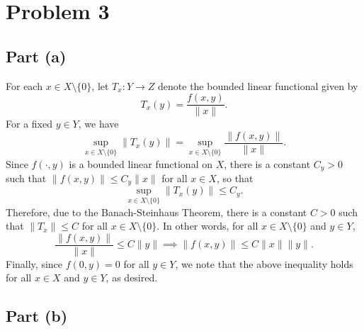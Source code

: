 \documentclass[11pt]{article}
\theoremstyle{thmstyle}
\theoremstyle{defstyle}
\renewcommand{\le}{\leqslant}
\newcommand{\sminus}{\setminus}
\begin{document}
\section{Problem 3}

\subsection{Part (a)}

For each $x\in X\setminus\{0\}$, let $T_x\colon Y\to Z$ denote the bounded linear functional given by 
\begin{equation*}
    T_x(y) = \frac{f(x, y)}{\|x\|}.
\end{equation*}
For a fixed $y\in Y$, we have 
\begin{equation*}
    \sup_{x\in X\setminus\{0\}}\|T_x(y)\| = \sup_{x\in X\setminus\{0\}}\frac{\|f(x, y)\|}{\|x\|}.
\end{equation*}
Since $f(\cdot, y)$ is a bounded linear functional on $X$, there is a constant $C_y > 0$ such that $\|f(x, y)\|\le C_y\|x\|$ for all $x\in X$, so that 
\begin{equation*}
    \sup_{x\in X\sminus\{0\}}\|T_x(y)\|\le C_y.
\end{equation*}
Therefore, due to the Banach-Steinhaus Theorem, there is a constant $C > 0$ such that $\|T_x\|\le C$ for all $x\in X\setminus\{0\}$. In other words, for all $x\in X\setminus\{0\}$ and $y\in Y$, 
\begin{equation*}
    \frac{\|f(x, y)\|}{\|x\|}\le C\|y\|\implies \|f(x, y)\|\le C\|x\|\|y\|.
\end{equation*}
Finally, since $f(0, y) = 0$ for all $y\in Y$, we note that the above inequality holds for all $x\in X$ and $y\in Y$, as desired. 

\subsection{Part (b)}
\end{document}
